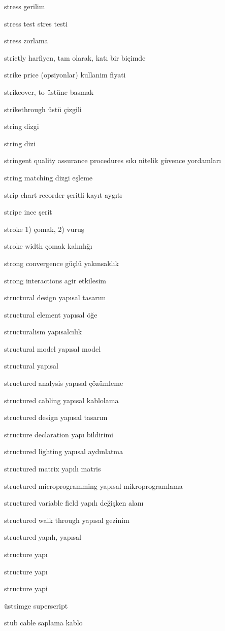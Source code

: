 \documentclass[12pt,fleqn]{article}\usepackage{../../common}
\begin{document}
stress gerilim

stress test stres testi

stress zorlama

strictly harfiyen, tam olarak, katı bir biçimde

strike price (opsiyonlar) kullanim fiyati

strikeover, to üstüne basmak

strikethrough üstü çizgili

string dizgi

string dizi

stringent quality assurance procedures sıkı nitelik güvence yordamları

string matching dizgi eşleme

strip chart recorder şeritli kayıt aygıtı

stripe ince şerit

stroke 1) çomak, 2) vuruş

stroke width çomak kalınlığı

strong convergence güçlü yakınsaklık

strong interactions agir etkilesim

structural design yapısal tasarım

structural element yapısal öğe

structuralism yapısalcılık

structural model yapısal model

structural yapısal

structured analysis yapısal çözümleme

structured cabling yapısal kablolama

structured design yapısal tasarım

structure declaration yapı bildirimi

structured lighting yapısal aydınlatma

structured matrix yapılı matris

structured microprogramming yapısal mikroprogramlama

structured variable field yapılı değişken alanı

structured walk through yapısal gezinim

structured yapılı, yapısal

structure yapı

structure yapı

structure yapi

üstsimge superscript

stub cable saplama kablo
\end{document}
